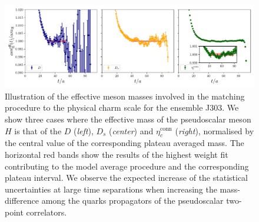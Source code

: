    
   \begin{figure}[!t]
   	\centering
   	\includegraphics[scale=0.52]{./cap6/figs/matching/meff_comparison.pdf}
   	\caption{Illustration of the effective meson masses involved in the matching procedure to the physical charm scale for the ensemble J303. We show three cases where the effective mass of the pseudoscalar meson $H$ is that of the $D$ (\textit{left}), $D_s$ (\textit{center}) and $\eta_c^{\mathrm{conn}}$  (\textit{right}), normalised by the central value of the corresponding plateau averaged mass.  The horizontal red bands show the results of the highest weight fit contributing to the model average procedure and the corresponding plateau interval. We observe the expected increase of the statistical uncertainties at large time separations when increasing the mass-difference among the quarks propagators of the pseudoscalar two-point correlators. 
}
   	\label{fig:corr_comparison}
   \end{figure}
   
